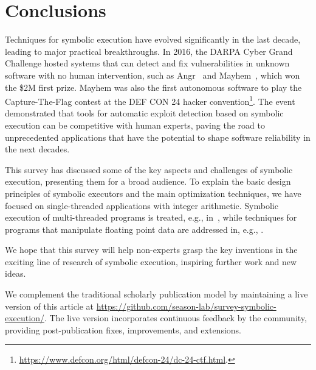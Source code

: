 
\vspace{-2pt} %
\section{Conclusions}
\label{se:conclusions}

Techniques for symbolic execution have evolved significantly in the last decade, leading to major practical breakthroughs. In 2016, the DARPA Cyber Grand Challenge hosted systems that can detect and fix vulnerabilities in unknown software with no human intervention, such as {\sc Angr}~\cite{ANGR-SSP16} and {\sc Mayhem}~\cite{MAYHEM-SP12}, which won the \$2M first prize. {\sc Mayhem} was also the first autonomous software to play the Capture-The-Flag contest at the DEF CON 24 hacker convention\footnote{\url{https://www.defcon.org/html/defcon-24/dc-24-ctf.html}.}. The event demonstrated that tools for automatic exploit detection based on symbolic execution can be competitive with human experts, paving the road to unprecedented applications %
that have the potential to shape software %
reliability in the next decades. 

This survey has discussed some of the key aspects and challenges of symbolic execution, presenting them for a broad audience. To explain the basic design principles of symbolic executors and the main optimization techniques, we have focused on single-threaded applications with integer arithmetic. Symbolic execution of multi-threaded programs is treated, e.g., 
{in~\cite{BGC-OOPSLA14,GKW-ESEC15}}, 
while techniques for programs that manipulate floating point data are addressed 
{in, e.g., \cite{RPW-SIGSOFT15}}.

We hope that this survey will help non-experts grasp the key inventions in the exciting line of research of symbolic execution, inspiring further work and new ideas.



\ifdefined\arxivver
{}
We complement the traditional scholarly publication model by maintaining a live version of this article at {\href{https://github.com/season-lab/survey-symbolic-execution}{https://github.com/season-lab/survey-symbolic-execution/}}. The live version incorporates continuous feedback by the community, providing post-publication fixes, improvements, and extensions.
\fi
